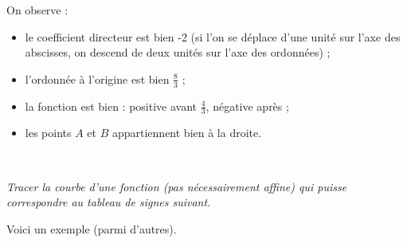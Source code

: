 \documentclass[12pt]{article}
\begin{document}
\begin{exercice}
\begin{enumerate}
\begin{multicols}{2}
\begin{tikzpicture}[domain=-1:2,very thick]
    \end{tikzpicture}

    On observe :
    \begin{itemize}
      \item le coefficient directeur est bien -2 (si l'on se déplace d'une unité sur l'axe des abscisses, on descend de deux unités sur l'axe des ordonnées) ;
      \item l'ordonnée à l'origine est bien $\frac{8}{3}$ ;
      \item la fonction est bien : positive avant $\frac{4}{3}$, négative après ;
      \item les points $A$ et $B$ appartiennent bien à la droite.
    \end{itemize}
  \end{multicols}
  \end{enumerate}
\end{exercice}

\begin{exercice}~

  \emph{Tracer la courbe d'une fonction (pas nécessairement affine) qui puisse correspondre au tableau de signes suivant.}

      \begin{center}
      \end{center}

      Voici un exemple (parmi d'autres).
      \begin{center}
  \end{center}
\end{exercice}
\end{document}

